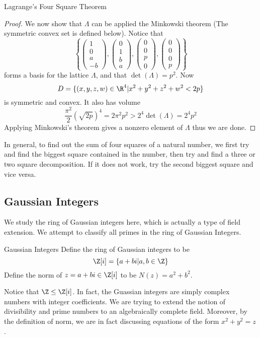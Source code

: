 \begin{thm}{Lagrange's Four Square Theorem}{}
\begin{proof}
We now show that $\Lambda$ can be applied the Minkowski theorem (The symmetric convex set is defined below). Notice that $$\left\{\begin{pmatrix} 1\\ 0\\ a\\ -b\end{pmatrix}, \begin{pmatrix} 0\\ 1\\ b\\ a\end{pmatrix}, \begin{pmatrix} 0\\ 0\\ p\\ 0\end{pmatrix}, \begin{pmatrix} 0\\ 0\\ 0\\ p\end{pmatrix}\right\}$$ forms a basis for the lattice $\Lambda$, and that $\det(\Lambda)=p^2$. Now $$D=\{(x,y,z,w)\in\R^4|x^2+y^2+z^2+w^2<2p\}$$ is symmetric and convex. It also has volume $$\frac{\pi^2}{2}(\sqrt{2p})^4=2\pi^2p^2>2^4\det(\Lambda)=2^4p^2$$ Applying Minkowski's theorem gives a nonzero element of $\Lambda$ thus we are done. 
\end{proof}
\end{thm}

In general, to find out the sum of four squares of a natural number, we first try and find the biggest square contained in the number, then try and find a three or two square decomposition. If it does not work, try the second biggest square and vice versa. 

\subsection{Gaussian Integers}
We study the ring of Gaussian integers here, which is actually a type of field extension. We attempt to classify all primes in the ring of Gaussian Integers. 
\begin{defn}{Gaussian Integers}{} Define the ring of Gaussian integers to be $$\Z[i]=\{a+bi|a,b\in\Z\}$$ Define the norm of $z=a+bi\in\Z[i]$ to be $N(z)=a^2+b^2$. 
\end{defn}

Notice that $\Z\leq\Z[i]$. In fact, the Guassian integers are simply complex numbers with integer coefficients. We are trying to extend the notion of divisibility and prime numbers to an algebraically complete field. Moreover, by the definition of norm, we are in fact discussing equations of the form $x^2+y^2=z$. 


